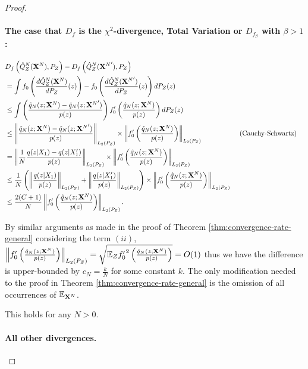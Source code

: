 \begin{proof}
\paragraph{The case that $D_f$ is the $\chi^2$-divergence, Total Variation or $D_{f_\beta}$ with $\beta>1$:}
\begin{align*}
    & D_f\left( \hat{Q}_Z^N(\mathbf{X}^N) , P_Z\right) - D_f\left( \hat{Q}_Z^N({\mathbf{X}^N}') , P_Z\right)  \\
    &= \int f_0\left( \frac{d\hat{Q}_Z^N(\mathbf{X}^N)}{dP_Z}(z) \right) - f_0\left( \frac{d\hat{Q}_Z^N({\mathbf{X}^N}')}{dP_Z}(z) \right) dP_Z(z)  \\
    &\leq \int \left( \frac{\hat{q}_N(z;\mathbf{X}^N) - \hat{q}_N(z;{\mathbf{X}^N}')}{p(z)} \right)     f'_0\left(\frac{\hat{q}_N(z;\mathbf{X}^N)}{p(z)} \right) dP_Z(z)  \\
    &\leq \left\| \frac{\hat{q}_N(z;\mathbf{X}^N) - \hat{q}_N(z;{\mathbf{X}^N}')}{p(z)} \right\|_{L_2(P_Z)} \times \left\| f'_0\left(\frac{\hat{q}_N(z;\mathbf{X}^N)}{p(z)}\right) \right\|_{L_2(P_Z)}
    && \text{ (Cauchy-Schwartz)}\\
    &= \left\| \frac{1}{N} \frac{q(z|X_1) - q(z|X'_1)}{p(z)} \right\|_{L_2(P_Z)} \times \left\| f'_0\left(\frac{\hat{q}_N(z;\mathbf{X}^N)}{p(z)}\right) \right\|_{L_2(P_Z)} \\
    &\leq \frac{1}{N} \left( \left\| \frac{q(z|X_1)}{p(z)}\right\|_{L_2(P_Z)} + \left\|\frac{q(z|X'_1)}{p(z)} \right\|_{L_2(P_Z)} \right)\times \left\| f'_0\left(\frac{\hat{q}_N(z;\mathbf{X}^N)}{p(z)}\right) \right\|_{L_2(P_Z)} \\
    &\leq \frac{2(C+1)}{N} \left\| f'_0\left(\frac{\hat{q}_N(z;\mathbf{X}^N)}{p(z)}\right) \right\|_{L_2(P_Z)}.
\end{align*}

By similar arguments as made in the proof of Theorem \ref{thm:convergence-rate-general} considering the term $(ii)$, $\left\| f_0'\left(\frac{\hat{q}_N(z;\mathbf{X}^N)}{p(z)}\right) \right\|_{L_2(P_Z)} = \sqrt{\mathbb{E}_Z {f'_0}^2\left(\frac{\hat{q}_N(z;\mathbf{X}^N)}{p(z)}\right)} = O(1)$ thus we have the difference is upper-bounded by $c_N = \frac{k}{N}$ for some constant $k$.
The only modification needed to the proof in Theorem \ref{thm:convergence-rate-general} is the omission of all occurrences of $\mathbb{E}_{\mathbf{X}^N}$.

This holds for any $N>0$.

\paragraph{All other divergences.}


\end{proof}
